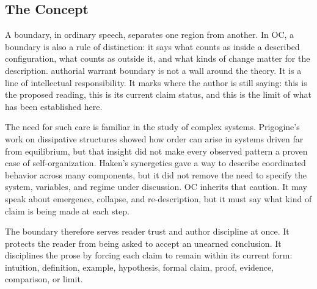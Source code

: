 \documentclass[11pt,a4paper,openany]{book}
\begin{document}
\subsection{The Concept}
A boundary, in ordinary speech, separates one region from another. In OC, a boundary is also a rule of distinction: it says what counts as inside a described configuration, what counts as outside it, and what kinds of change matter for the description. authorial warrant boundary is not a wall around the theory. It is a line of intellectual responsibility. It marks where the author is still saying: this is the proposed reading, this is its current claim status, and this is the limit of what has been established here. \cite{prigogine_dissipative,haken_synergetics}\par
The need for such care is familiar in the study of complex systems. Prigogine's work on dissipative structures showed how order can arise in systems driven far from equilibrium, but that insight did not make every observed pattern a proven case of self-organization. Haken's synergetics gave a way to describe coordinated behavior across many components, but it did not remove the need to specify the system, variables, and regime under discussion. OC inherits that caution. It may speak about emergence, collapse, and re-description, but it must say what kind of claim is being made at each step.\par
The boundary therefore serves reader trust and author discipline at once. It protects the reader from being asked to accept an unearned conclusion. It disciplines the prose by forcing each claim to remain within its current form: intuition, definition, example, hypothesis, formal claim, proof, evidence, comparison, or limit.\par
\end{document}
